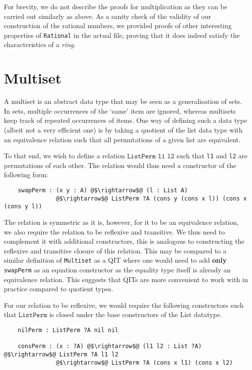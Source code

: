 \documentclass[12pt,twoside,maitrise]{dms}
\theoremstyle{definition}
\numberwithin{equation}{section}
\numberwithin{table}{chapter}
\numberwithin{figure}{chapter}
\newcommand\id[1] {\texttt{#1}}
\newcommand\fn[1] {\texttt{#1}}
\begin{document}
For brevity, we do not describe the proofs for multiplication as they can be
carried out similarly as above. As a sanity check of the validity of
our construction of the rational numbers, we provided proofs of other
interesting properties of \id{Rational} in the actual file, proving that it does
indeed satisfy the characteristics of a \emph{ring}.

\section{Multiset}\label{sec:multiset}

A multiset is an abstract data type that may be seen as a generalisation of
sets. In sets, multiple occurrences of the `same' item are ignored, whereas
multisets keep track of repeated occurrences of items. One way of defining such
a data type (albeit not a very efficient one) is by taking a quotient of the
list data type with an equivalence relation such that all permutations of a
given list are equivalent.

To that end, we wish to define a relation $\fn{ListPerm l1 l2}$ such that
\id{l1} and \id{l2} are permutations of each other. The relation would thus need
a constructor of the following form:

\begin{verbatim}
    swapPerm : (x y : A) @$\rightarrow$@ (l : List A)
               @$\rightarrow$@ ListPerm ?A (cons y (cons x l)) (cons x (cons y l))
\end{verbatim}

The relation is symmetric as it is, however, for it to be an equivalence
relation, we also require the relation to be reflexive and transitive. We thus
need to complement it with additional constructors, this is analogous to
constructing the reflexive and transitive closure of this relation. This may be
compared to a similar definition of \id{Multiset} as a QIT where one would need
to add \textbf{only} \id{swapPerm} as an equation constructor as the equality
type itself is already an equivalence relation. This suggests that QITs are more
convenient to work with in practice compared to quotient types.

For our relation to be reflexive, we would require the following constructors
such that $\fn{ListPerm}$ is closed under the base constructors of the List
datatype.

\begin{verbatim}
    nilPerm : ListPerm ?A nil nil

    consPerm : (x : ?A) @$\rightarrow$@ (l1 l2 : List ?A) @$\rightarrow$@ ListPerm ?A l1 l2
               @$\rightarrow$@ ListPerm ?A (cons x l1) (cons x l2)
\end{verbatim}
\end{document}
